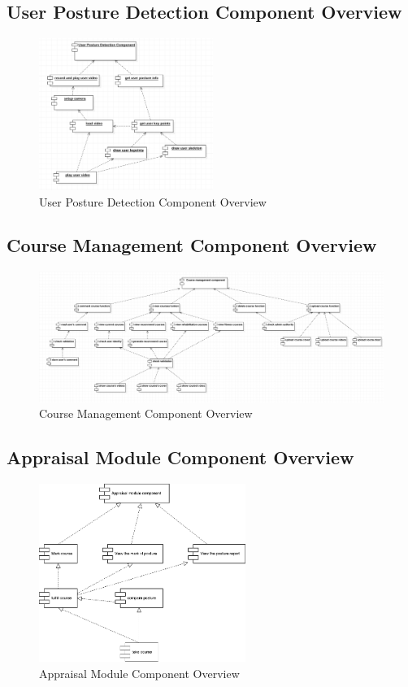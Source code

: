 \documentclass[16pt]{scrreprt}
\begin{document}
\subsection{User Posture Detection Component Overview}
\begin{figure}[H]
  \centering
  \includegraphics[width=0.505\textwidth]{diagrams/detection-com.png}
  \caption{User Posture Detection Component Overview}
\end{figure}

\subsection{Course Management Component Overview}
\begin{figure}[H]
    \centering
    \includegraphics[width=1\textwidth]{diagrams/course-management.png}
    \caption{Course Management Component Overview}
\end{figure}

\subsection{Appraisal Module Component Overview}
\begin{figure}[H]
    \centering
    \includegraphics[width=0.6\textwidth]{diagrams/appraisal.png}
    \caption{Appraisal Module Component Overview}
\end{figure}
\end{document}
